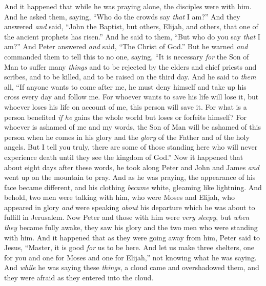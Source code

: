 \begin{biblechapter}
 And it happened that while he was praying alone, the disciples were with him. And he asked them, saying, “Who do the crowds say \textit{that} I am?”
\verse And they answered \textit{and} said, “John the Baptist, but others, Elijah, and others, that one of the ancient prophets has risen.”
\verse And he said to them, “But who do you say \textit{that} I am?” And Peter answered \textit{and} said, “The Christ of God.”
 But he warned \textit{and} commanded them to tell this to no one,
\verse saying, “It is necessary \textit{for} the Son of Man to suffer many \textit{things} and to be rejected by the elders and chief priests and scribes, and to be killed, and to be raised on the third day.
 And he said to \textit{them} all, “If anyone wants to come after me, he must deny himself and take up his cross every day and follow me.
\verse For whoever wants to save his life will lose it, but whoever loses his life on account of me, this person will save it.
\verse For what is a person benefited \textit{if he} gains the whole world but loses or forfeits himself?
\verse For whoever is ashamed of me and my words, the Son of Man will be ashamed of this person when he comes in his glory and the \textit{glory} of the Father and of the holy angels.
\verse But I tell you truly, there are some of those standing here who will never experience death until they see the kingdom of God.”
 Now it happened that about eight days after these words, he took along Peter and John and James \textit{and} went up on the mountain to pray.
\verse And as he was praying, the appearance of his face became different, and his clothing \textit{became} white, gleaming like lightning.
\verse And behold, two men were talking with him, who were Moses and Elijah,
\verse who appeared in glory \textit{and} were speaking \textit{about} his departure which he was about to fulfill in Jerusalem.
\verse Now Peter and those with him were \textit{very sleepy}, but \textit{when they} became fully awake, they saw his glory and the two men who were standing with him.
\verse And it happened that as they were going away from him, Peter said to Jesus, “Master, it is good \textit{for} us to be here. And let us make three shelters, one for you and one for Moses and one for Elijah,” not knowing what he was saying.
\verse And \textit{while} he was saying these \textit{things}, a cloud came and overshadowed them, and they were afraid as they entered into the cloud.

\end{biblechapter}
